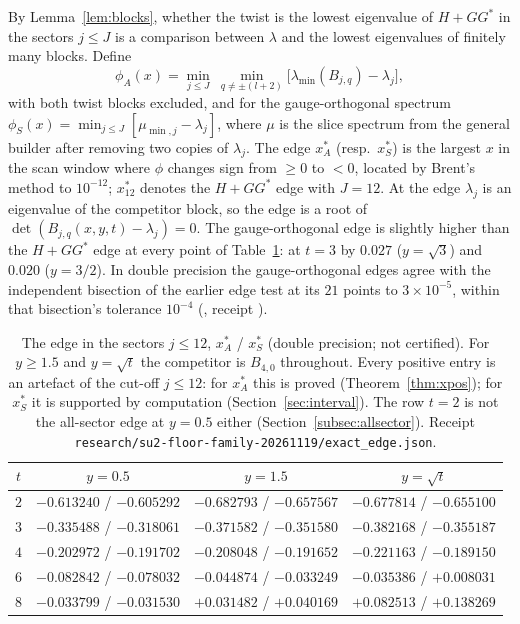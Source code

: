 \documentclass[11pt]{article}
\theoremstyle{definition}
\theoremstyle{remark}
\begin{document}
By Lemma~\ref{lem:blocks}, whether the twist is the lowest eigenvalue of $H+GG^*$ in the sectors $j\le J$ is a
comparison between $\lambda$ and the lowest eigenvalues of finitely many blocks. Define
\[
  \phi_A(x)=\min_{j\le J}\ \min_{q\ne\pm(l+2)}\bigl[\lambda_{\min}(B_{j,q})-\lambda_j\bigr],
\]
with both twist blocks excluded, and for the gauge-orthogonal spectrum $\phi_S(x)=\min_{j\le J}[\mu_{\min,j}-\lambda_j]$,
where $\mu$ is the slice spectrum from the general builder after removing two copies of $\lambda_j$. The edge $x^*_A$
(resp.\ $x^*_S$) is the largest $x$ in the scan window where $\phi$ changes sign from $\ge0$ to $<0$, located by Brent's
method to $10^{-12}$; $x^*_{12}$ denotes the $H+GG^*$ edge with $J=12$. At the edge $\lambda_j$ is an eigenvalue of the
competitor block, so the edge is a root of $\det(B_{j,q}(x,y,t)-\lambda_j)=0$. The gauge-orthogonal edge is slightly
higher than the $H+GG^*$ edge at every point of Table~\ref{tab:edge}: at $t=3$ by $0.027$ ($y=\sqrt3$) and $0.020$
($y=3/2$). In double precision the gauge-orthogonal edges agree with the independent bisection of the earlier edge test
at its $21$ points to $3\times10^{-5}$, within that bisection's tolerance $10^{-4}$ (,
receipt ).

\begin{table}[t]
\centering
\caption{The edge in the sectors $j\le12$, $x^*_A$ / $x^*_S$ (double precision; not certified). For $y\ge1.5$ and
$y=\sqrt t$ the competitor is $B_{4,0}$ throughout. Every positive entry is an artefact of the cut-off $j\le12$: for
$x^*_A$ this is proved (Theorem~\ref{thm:xpos}); for $x^*_S$ it is supported by computation
(Section~\ref{sec:interval}). The row $t=2$ is not the all-sector edge at $y=0.5$ either
(Section~\ref{subsec:allsector}). Receipt \texttt{research/su2-floor-family-20261119/}\allowbreak\texttt{exact\_edge.json}.}
\label{tab:edge}
\begin{tabular}{@{}cccc@{}}
\toprule
$t$ & $y=0.5$ & $y=1.5$ & $y=\sqrt t$\\
\midrule
$2$ & $-0.613240$ / $-0.605292$ & $-0.682793$ / $-0.657567$ & $-0.677814$ / $-0.655100$\\
$3$ & $-0.335488$ / $-0.318061$ & $-0.371582$ / $-0.351580$ & $-0.382168$ / $-0.355187$\\
$4$ & $-0.202972$ / $-0.191702$ & $-0.208048$ / $-0.191652$ & $-0.221163$ / $-0.189150$\\
$6$ & $-0.082842$ / $-0.078032$ & $-0.044874$ / $-0.033249$ & $-0.035386$ / $+0.008031$\\
$8$ & $-0.033799$ / $-0.031530$ & $+0.031482$ / $+0.040169$ & $+0.082513$ / $+0.138269$\\
\bottomrule
\end{tabular}
\end{table}
\end{document}
